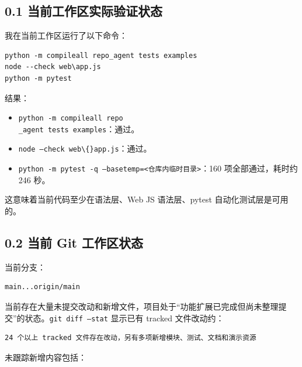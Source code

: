 \documentclass[UTF8,12pt,openany]{ctexbook}
\begin{document}
\subsection{0.1 当前工作区实际验证状态}

我在当前工作区运行了以下命令：\par

\begin{lstlisting}
python -m compileall repo_agent tests examples
node --check web\app.js
python -m pytest
\end{lstlisting}

结果：\par

\begin{itemize}
\item \texttt{python -m compileall repo\\_agent tests examples}：通过。
\item \texttt{node --check web\textbackslash\{\}app.js}：通过。
\item \texttt{python -m pytest -q --basetemp=<仓库内临时目录>}：160 项全部通过，耗时约 246 秒。
\end{itemize}

这意味着当前代码至少在语法层、Web JS 语法层、pytest 自动化测试层是可用的。\par

\subsection{0.2 当前 Git 工作区状态}

当前分支：\par

\begin{lstlisting}
main...origin/main
\end{lstlisting}

当前存在大量未提交改动和新增文件，项目处于“功能扩展已完成但尚未整理提交”的状态。\texttt{git diff --stat} 显示已有 tracked 文件改动约：\par

\begin{lstlisting}
24 个以上 tracked 文件存在改动，另有多项新增模块、测试、文档和演示资源
\end{lstlisting}

未跟踪新增内容包括：\par
\end{document}
